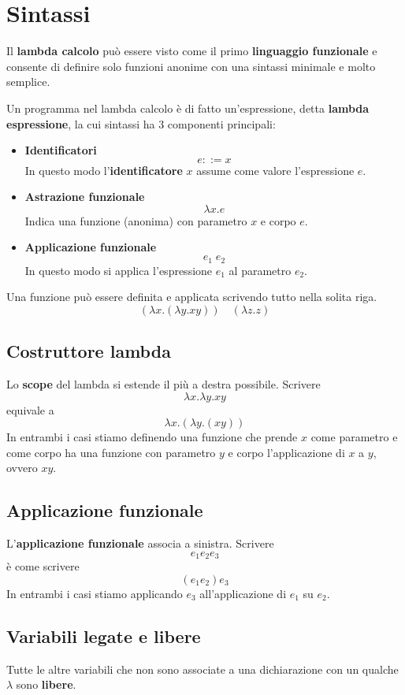 \section{Sintassi}
Il \textbf{lambda calcolo} può essere visto come il primo \textbf{linguaggio funzionale} e consente di definire
solo funzioni anonime con una sintassi minimale e molto semplice.

Un programma nel lambda calcolo è di fatto un'espressione, detta \textbf{lambda espressione}, la cui sintassi ha
3 componenti principali:
\begin{itemize}
	\item \textbf{Identificatori}
	      \[ e ::= x \]
	      In questo modo l'\textbf{identificatore} $x$ assume come valore l'espressione $e$.
	\item \textbf{Astrazione funzionale}
	      \[ \lambda x.e \]
	      Indica una funzione (anonima) con parametro $x$ e corpo $e$.
	\item \textbf{Applicazione funzionale}
	      \[ e_1 \; e_2 \]
	      In questo modo si applica l'espressione $e_1$ al parametro $e_2$.
\end{itemize}
Una funzione può essere definita e applicata scrivendo tutto nella solita riga.
\[ (\lambda x.(\lambda y.xy)) \quad (\lambda z.z) \]

\subsection{Costruttore lambda}
Lo \textbf{scope} del lambda si estende il più a destra possibile. Scrivere
\[ \lambda x. \lambda y. x y \]
equivale a
\[ \lambda x. (\lambda y. (x y)) \]
In entrambi i casi stiamo definendo una funzione che prende $x$ come parametro e come corpo ha una funzione con
parametro $y$ e corpo l'applicazione di $x$ a $y$, ovvero $xy$.

\subsection{Applicazione funzionale}
L'\textbf{applicazione funzionale} associa a sinistra. Scrivere
\[ e_1 e_2 e_3 \]
è come scrivere
\[ (e_1 e_2) e_3 \]
In entrambi i casi stiamo applicando $e_3$ all'applicazione di $e_1$ su $e_2$.

\subsection{Variabili legate e libere}
Tutte le altre variabili che non sono associate a una dichiarazione con un qualche $\lambda$ sono \textbf{libere}.

